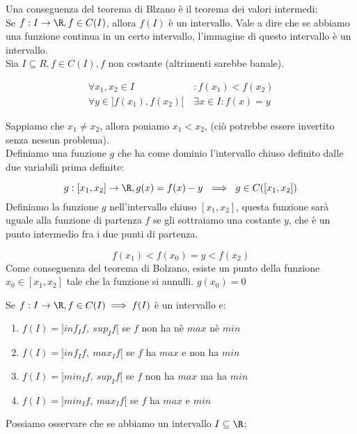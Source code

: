 \documentclass[../analisi.tex]{subfiles}
\begin{document}
\begin{defn}
Una conseguenza del teorema di Blzano è il teorema dei valori intermedi:\\
Se $f: I \to \R, f \in C(I)$, allora $f(I)$ è un intervallo. Vale a dire che 
se abbiamo una funzione continua in un certo intervallo, l'immagine di questo
intervallo è un intervallo.\\
Sia $ I \subseteq R, f\in C(I), f$ non costante (altrimenti sarebbe banale).

\begin{equation}
	\begin{aligned}
		\forall x_1, x_2 \in I &: f(x_1) < f(x_2)\\
		\forall y \in ]f(x_1), f(x_2)[\ &\exists x \in I : f(x) = y
	\end{aligned}
\end{equation}
\end{defn}

\begin{dimo}
	Sappiamo che $ x_1 \neq x_2 $, allora poniamo $ x_1 < x_2 $, (ciò potrebbe
	essere invertito senza nessun problema).\\
	Definiamo una funzione $g$ che ha come dominio l'intervallo chiuso
	definito dalle due variabili prima definite:

	\begin{equation}
		g: [ x_1, x_2 ] \to \R, g(x) = f(x) - y\ 
		\implies\ g \in C([x_1, x_2])
	\end{equation}
	Definiamo la funzione $g$ nell'intervallo chiuso $ [x_1, x_2] $, questa
	funzione sarà uguale alla funzione di partenza $f$ se gli sottraiamo
	una costante $y$, che è un punto intermedio fra i due punti di partenza.

	\begin{equation}
		f(x_1) < f(x_0) = y < f(x_2)
	\end{equation}
	Come conseguenza del teorema di Bolzano, esiste un punto della funzione 
	$x_0 \in [x_1, x_2]$ tale che la funzione si annulli. $g(x_0) = 0 $ 

\end{dimo}
Se $f: I \to \R, f \in C(I) \implies f(I)$ è un intervallo e: 

\begin{enumerate}
	\item $f(I) = ]inf_I f,\ sup_I f[$ se $f$ non ha nè $max$ nè $min$
	\item $f(I) = ]inf_I f,\ max_I f[$ se $f$ ha $max$ e non ha $min$
	\item $f(I) = ]min_I f,\ sup_I f[$ se $f$ non ha $max$ ma ha $min$
	\item $f(I) = ]min_I f,\ max_I f[$ se $f$ ha $max$ e $min$
\end{enumerate}
Possiamo osservare che se abbiamo un intervallo $I \subseteq \R$:
\end{document}
